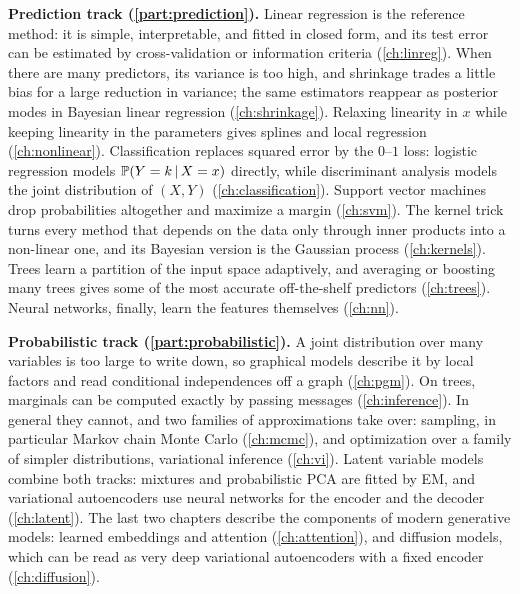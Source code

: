 \noindent\textbf{Prediction track (\cref{part:prediction}).} Linear regression is the reference method: it is simple, interpretable, and fitted in closed form, and its test error can be estimated by cross-validation or information criteria (\cref{ch:linreg}). When there are many predictors, its variance is too high, and shrinkage trades a little bias for a large reduction in variance; the same estimators reappear as posterior modes in Bayesian linear regression (\cref{ch:shrinkage}). Relaxing linearity in $x$ while keeping linearity in the parameters gives splines and local regression (\cref{ch:nonlinear}). Classification replaces squared error by the $0$--$1$ loss: logistic regression models $\mathbb{P}(Y=k\,|\, X=x)$ directly, while discriminant analysis models the joint distribution of $(X,Y)$ (\cref{ch:classification}). Support vector machines drop probabilities altogether and maximize a margin (\cref{ch:svm}). The kernel trick turns every method that depends on the data only through inner products into a non-linear one, and its Bayesian version is the Gaussian process (\cref{ch:kernels}). Trees learn a partition of the input space adaptively, and averaging or boosting many trees gives some of the most accurate off-the-shelf predictors (\cref{ch:trees}). Neural networks, finally, learn the features themselves (\cref{ch:nn}).

\smallskip\noindent\textbf{Probabilistic track (\cref{part:probabilistic}).} A joint distribution over many variables is too large to write down, so graphical models describe it by local factors and read conditional independences off a graph (\cref{ch:pgm}). On trees, marginals can be computed exactly by passing messages (\cref{ch:inference}). In general they cannot, and two families of approximations take over: sampling, in particular Markov chain Monte Carlo (\cref{ch:mcmc}), and optimization over a family of simpler distributions, variational inference (\cref{ch:vi}). Latent variable models combine both tracks: mixtures and probabilistic PCA are fitted by EM, and variational autoencoders use neural networks for the encoder and the decoder (\cref{ch:latent}). The last two chapters describe the components of modern generative models: learned embeddings and attention (\cref{ch:attention}), and diffusion models, which can be read as very deep variational autoencoders with a fixed encoder (\cref{ch:diffusion}).

